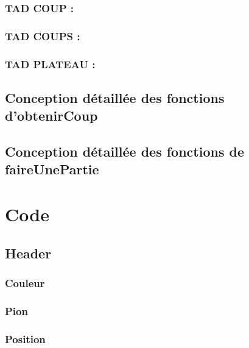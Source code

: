 \documentclass{article}
\begin{document}
\subsubsection{TAD COUP :}


\subsubsection{TAD COUPS :}


\subsubsection{TAD PLATEAU :}


\subsection{Conception détaillée des fonctions d'obtenirCoup}


\subsection{Conception détaillée des fonctions de faireUnePartie}



\newpage

\section{Code}

\subsection{Header}

\subsubsection{Couleur}


\subsubsection{Pion}


\subsubsection{Position}

\end{document}
